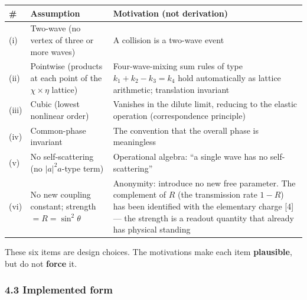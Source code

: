 \documentclass[
  a4paper,
]{article}
\newcounter{none} %
\begin{document}
{\def\LTcaptype{none} %
\begin{longtable}[]{@{}
  >{\raggedright\arraybackslash}p{}
  >{\raggedright\arraybackslash}p{}
  >{\raggedright\arraybackslash}p{}@{}}
\toprule\noalign{}
\begin{minipage}[b]{\linewidth}\raggedright
\#
\end{minipage} & \begin{minipage}[b]{\linewidth}\raggedright
Assumption
\end{minipage} & \begin{minipage}[b]{\linewidth}\raggedright
Motivation (not derivation)
\end{minipage} \\
\midrule\noalign{}
\endhead
\bottomrule\noalign{}
\endlastfoot
(i) & Two-wave (no vertex of three or more waves) & A collision is a
two-wave event \\
(ii) & Pointwise (products at each point of the \(\chi\times\eta\)
lattice) & Four-wave-mixing sum rules of type \(k_1+k_2-k_3=k_4\) hold
automatically as lattice arithmetic; translation invariant \\
(iii) & Cubic (lowest nonlinear order) & Vanishes in the dilute limit,
reducing to the elastic operation (correspondence principle) \\
(iv) & Common-phase invariant & The convention that the overall phase is
meaningless \\
(v) & No self-scattering (no \(|a|^2a\)-type term) & Operational
algebra: ``a single wave has no self-scattering'' \\
(vi) & No new coupling constant; strength \(=R=\sin^2\theta\) &
Anonymity: introduce no new free parameter. The complement of \(R\) (the
transmission rate \(1-R\)) has been identified with the elementary
charge {[}4{]} --- the strength is a readout quantity that already has
physical standing \\
\end{longtable}
}

These six items are design choices. The motivations make each item
\textbf{plausible}, but do not \textbf{force} it.

\subsubsection{4.3 Implemented form}\label{implemented-form}
\end{document}
